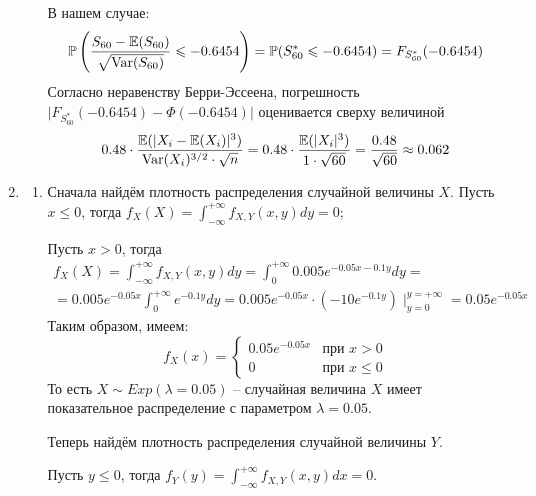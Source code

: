 \documentclass[12pt, a4paper]{article}\usepackage[]{graphicx}\usepackage[]{color}
\begin{document}
\begin{enumerate}
\begin{enumerate}
	В нашем случае:
	\[
	\mathbb{P}\left( \frac{S_{60} - \mathbb{E}(S_{60})}{\sqrt{\operatorname{Var}(S_{60})}} \leqslant -0.6454 \right) = \mathbb{P}(S^*_{60} \leqslant -0.6454) =
	F_{S^*_{60}} (-0.6454)
	\]
	Согласно неравенству Берри-Эссеена, погрешность $\vert F_{S^*_{60}} (-0.6454) - \Phi(-0.6454) \vert$ оценивается сверху величиной
	\[
	0.48 \cdot \frac{\mathbb{E}(\vert X_i - \mathbb{E}(X_i) \vert^3 )}{\operatorname{Var}(X_i)^{3/2} \cdot \sqrt{n}} = 0.48 \cdot \frac{\mathbb{E}(\vert X_i \vert^3)}{1\cdot\sqrt{60}} = \frac{0.48}{\sqrt{60}} \approx0.062
	\]
\end{enumerate}
\item \begin{enumerate}
	\item Сначала найдём плотность распределения случайной величины $X$. Пусть $x \leq 0 $, тогда $f_X (X) = \int_{-\infty}^{+\infty} f_{X, Y} (x, y) dy  = 0$;

	Пусть $x >0 $, тогда
	\begin{multline*}
	f_X (X) = \int_{-\infty}^{+\infty} f_{X, Y} (x, y) dy = \int_{0}^{+\infty} 0.005 e^{-0.05x-0.1y} dy = \\
	= 0.005e^{-0.05x} \int_{0}^{+\infty} e^{-0.1y} dy = 0.005e^{-0.05x} \cdot \left(-10e^{-0.1y} \right) \mid_{y=0}^{y=+\infty} = 0.05 e^{-0.05x}
	\end{multline*}
	Таким образом, имеем:
	\[
	f_X (x) = \begin{cases}
	0.05 e^{-0.05x} & \text{при } x>0 \\
	0 & \text{при } x \leq 0
	\end{cases}
	\]
	То есть $X \sim Exp(\lambda=0.05)$ – случайная величина $X$ имеет показательное распределение с параметром $\lambda = 0.05$.

	Теперь найдём плотность распределения случайной величины $Y$.

	Пусть $y \leq 0 $, тогда $f_Y (y) = \int_{-\infty}^{+\infty} f_{X, Y} (x, y) dx  = 0$.


\end{enumerate}
\end{enumerate}
\end{document}
